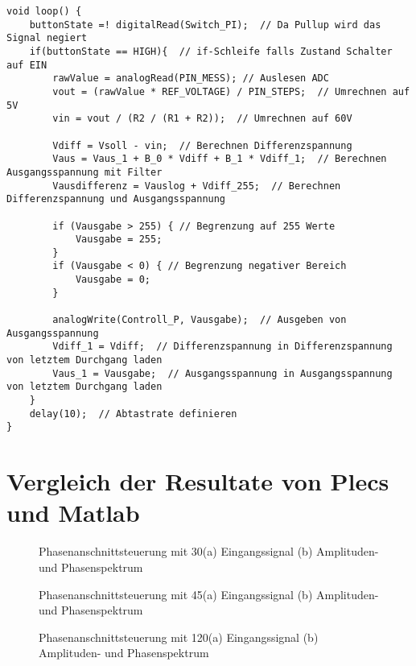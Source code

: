 \begin{appendix}
\begin{lstlisting}[basicstyle=\tiny,style=myArduino]
void loop() {
	buttonState =! digitalRead(Switch_PI);  // Da Pullup wird das Signal negiert
	if(buttonState == HIGH){  // if-Schleife falls Zustand Schalter auf EIN
		rawValue = analogRead(PIN_MESS); // Auslesen ADC
		vout = (rawValue * REF_VOLTAGE) / PIN_STEPS;  // Umrechnen auf 5V
		vin = vout / (R2 / (R1 + R2));  // Umrechnen auf 60V
		
		Vdiff = Vsoll - vin;  // Berechnen Differenzspannung
		Vaus = Vaus_1 + B_0 * Vdiff + B_1 * Vdiff_1;  // Berechnen Ausgangsspannung mit Filter
		Vausdifferenz = Vauslog + Vdiff_255;  // Berechnen Differenzspannung und Ausgangsspannung
		
		if (Vausgabe > 255) { // Begrenzung auf 255 Werte
			Vausgabe = 255;
		}
		if (Vausgabe < 0) { // Begrenzung negativer Bereich
			Vausgabe = 0;
		}
		
		analogWrite(Controll_P, Vausgabe);  // Ausgeben von Ausgangsspannung
		Vdiff_1 = Vdiff;  // Differenzspannung in Differenzspannung von letztem Durchgang laden
		Vaus_1 = Vausgabe;  // Ausgangsspannung in Ausgangsspannung von letztem Durchgang laden
	}
	delay(10);  // Abtastrate definieren
}
\end{lstlisting}
\newpage
\section{Vergleich der Resultate von Plecs und Matlab}\label{sec:Vergleich_der_Resultate}

\begin{figure}[ht!]
	\centering
	\qquad
	\caption{Phasenanschnittsteuerung mit 30\textdegree (a) Eingangssignal (b) Amplituden- und Phasenspektrum}
	\label{fig:Phasenanschnittsteuerung_mit_30}
\end{figure}

\begin{figure}[ht!]
	\centering
	\qquad
	\caption{Phasenanschnittsteuerung mit 45\textdegree (a) Eingangssignal (b) Amplituden- und Phasenspektrum}
	\label{fig:Phasenanschnittsteuerung_mit_45}
\end{figure}

\begin{figure}[ht!]
	\centering
	\qquad
	\caption{Phasenanschnittsteuerung mit 120\textdegree (a) Eingangssignal (b) Amplituden- und Phasenspektrum}
	\label{fig:Phasenanschnittsteuerung_mit_120}
\end{figure}


\end{appendix}
